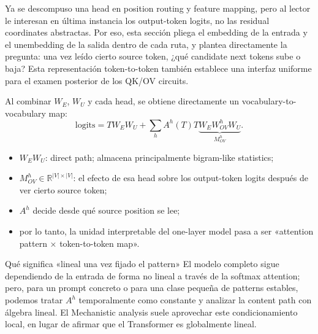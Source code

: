 Ya se descompuso una head en position routing y feature mapping, pero al lector le interesan en última instancia los output-token logits, no las residual coordinates abstractas. Por eso, esta sección pliega el embedding de la entrada y el unembedding de la salida dentro de cada ruta, y plantea directamente la pregunta: una vez leído cierto source token, ¿qué candidate next tokens sube o baja? Esta representación token-to-token también establece una interfaz uniforme para el examen posterior de los QK/OV circuits.

Al combinar $W_E$, $W_U$ y cada head, se obtiene directamente un vocabulary-to-vocabulary map:
\[
\mathrm{logits}
=T W_EW_U
+\sum_h A^h(T)
T\underbrace{W_EW_{OV}^hW_U}_{M_{OV}^h}.
\]

\begin{itemize}
  \item $W_EW_U$: direct path; almacena principalmente bigram-like statistics;
  \item $M_{OV}^h\in\mathbb{R}^{|V|\times |V|}$: el efecto de esa head sobre los output-token logits después de ver cierto source token;
  \item $A^h$ decide desde qué source position se lee;
  \item por lo tanto, la unidad interpretable del one-layer model pasa a ser «attention pattern × token-to-token map».
\end{itemize}



\begin{importantbox}{Qué significa «lineal una vez fijado el pattern»}
El modelo completo sigue dependiendo de la entrada de forma no lineal a través de la softmax attention; pero, para un prompt concreto o para una clase pequeña de patterns estables, podemos tratar $A^h$ temporalmente como constante y analizar la content path con álgebra lineal. El Mechanistic analysis suele aprovechar este condicionamiento local, en lugar de afirmar que el Transformer es globalmente lineal.
\end{importantbox}

